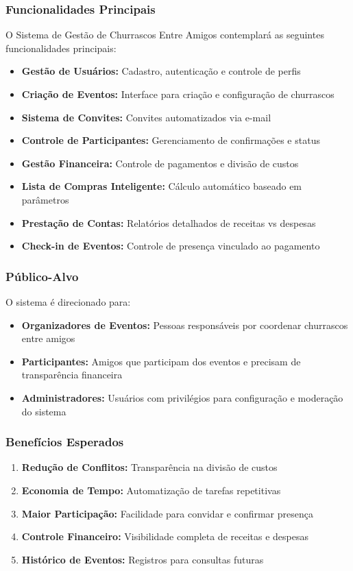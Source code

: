 \subsubsection{Funcionalidades Principais}

O Sistema de Gestão de Churrascos Entre Amigos contemplará as seguintes funcionalidades principais:

\begin{itemize}
    \item \textbf{Gestão de Usuários:} Cadastro, autenticação e controle de perfis
    \item \textbf{Criação de Eventos:} Interface para criação e configuração de churrascos
    \item \textbf{Sistema de Convites:} Convites automatizados via e-mail
    \item \textbf{Controle de Participantes:} Gerenciamento de confirmações e status
    \item \textbf{Gestão Financeira:} Controle de pagamentos e divisão de custos
    \item \textbf{Lista de Compras Inteligente:} Cálculo automático baseado em parâmetros
    \item \textbf{Prestação de Contas:} Relatórios detalhados de receitas vs despesas
    \item \textbf{Check-in de Eventos:} Controle de presença vinculado ao pagamento
\end{itemize}

\subsubsection{Público-Alvo}

O sistema é direcionado para:
\begin{itemize}
    \item \textbf{Organizadores de Eventos:} Pessoas responsáveis por coordenar churrascos entre amigos
    \item \textbf{Participantes:} Amigos que participam dos eventos e precisam de transparência financeira
    \item \textbf{Administradores:} Usuários com privilégios para configuração e moderação do sistema
\end{itemize}

\subsubsection{Benefícios Esperados}

\begin{enumerate}
    \item \textbf{Redução de Conflitos:} Transparência na divisão de custos
    \item \textbf{Economia de Tempo:} Automatização de tarefas repetitivas
    \item \textbf{Maior Participação:} Facilidade para convidar e confirmar presença
    \item \textbf{Controle Financeiro:} Visibilidade completa de receitas e despesas
    \item \textbf{Histórico de Eventos:} Registros para consultas futuras
\end{enumerate}
